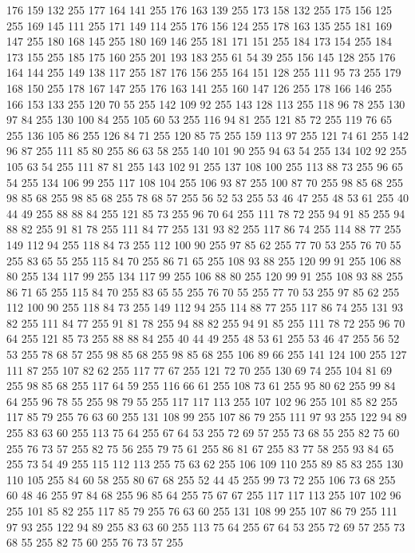 176 159 132 255 177 164 141 255 176 163 139 255 173 158 132 255 175 156 125 255 169 145 111 255 171 149 114 255 176 156 124 255 178 163 135 255 181 169 147 255 180 168 145 255 180 169 146 255 181 171 151 255 184 173 154 255 184 173 155 255 185 175 160 255 201 193 183 255 61 54 39 255 156 145 128 255 176 164 144 255 149 138 117 255 187 176 156 255 164 151 128 255 111 95 73 255 179 168 150 255 178 167 147 255 176 163 141 255 160 147 126 255 178 166 146 255 166 153 133 255 120 70 55 255 142 109 92 255 143 128 113 255 118 96 78 255 130 97 84 255 130 100 84 255 105 60 53 255 116 94 81 255 121 85 72 255 119 76 65 255 136 105 86 255 126 84 71 255 120 85 75 255 159 113 97 255 121 74 61 255 142 96 87 255 111 85 80 255 86 63 58 255 140 101 90 255 94 63 54 255 134 102 92 255 105 63 54 255 111 87 81 255 143 102 91 255 137 108 100 255 113 88 73 255 96 65 54 255 134 106 99 255 117 108 104 255 106 93 87 255 100 87 70 255 98 85 68 255 98 85 68 255 98 85 68 255
78 68 57 255 56 52 53 255 53 46 47 255 48 53 61 255 40 44 49 255 88 88 84 255 121 85 73 255 96 70 64 255 111 78 72 255 94 91 85 255 94 88 82 255 91 81 78 255 111 84 77 255 131 93 82 255 117 86 74 255 114 88 77 255 149 112 94 255 118 84 73 255 112 100 90 255 97 85 62 255 77 70 53 255 76 70 55 255 83 65 55 255 115 84 70 255 86 71 65 255 108 93 88 255 120 99 91 255 106 88 80 255 134 117 99 255 134 117 99 255 106 88 80 255 120 99 91 255 108 93 88 255 86 71 65 255 115 84 70 255 83 65 55 255 76 70 55 255 77 70 53 255 97 85 62 255 112 100 90 255 118 84 73 255 149 112 94 255 114 88 77 255 117 86 74 255 131 93 82 255 111 84 77 255 91 81 78 255 94 88 82 255 94 91 85 255 111 78 72 255 96 70 64 255 121 85 73 255 88 88 84 255 40 44 49 255 48 53 61 255 53 46 47 255 56 52 53 255 78 68 57 255 98 85 68 255 98 85 68 255 106 89 66 255 141 124 100 255 127 111 87 255 107 82 62 255
117 77 67 255 121 72 70 255 130 69 74 255 104 81 69 255 98 85 68 255 117 64 59 255 116 66 61 255 108 73 61 255 95 80 62 255 99 84 64 255 96 78 55 255 98 79 55 255 117 117 113 255 107 102 96 255 101 85 82 255 117 85 79 255 76 63 60 255 131 108 99 255 107 86 79 255 111 97 93 255 122 94 89 255 83 63 60 255 113 75 64 255 67 64 53 255 72 69 57 255 73 68 55 255 82 75 60 255 76 73 57 255 82 75 56 255 79 75 61 255 86 81 67 255 83 77 58 255 93 84 65 255 73 54 49 255 115 112 113 255 75 63 62 255 106 109 110 255 89 85 83 255 130 110 105 255 84 60 58 255 80 67 68 255 52 44 45 255 99 73 72 255 106 73 68 255 60 48 46 255 97 84 68 255 96 85 64 255 75 67 67 255 117 117 113 255 107 102 96 255 101 85 82 255 117 85 79 255 76 63 60 255 131 108 99 255 107 86 79 255 111 97 93 255 122 94 89 255 83 63 60 255 113 75 64 255 67 64 53 255 72 69 57 255 73 68 55 255 82 75 60 255 76 73 57 255
